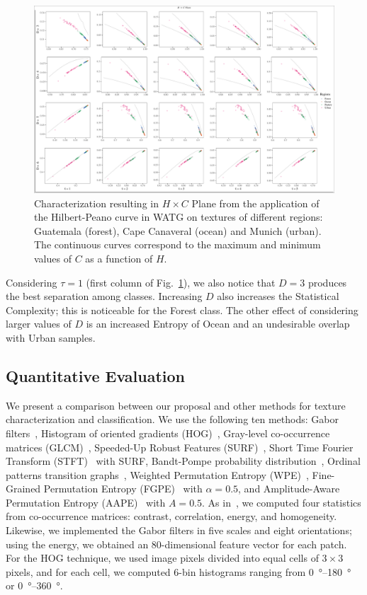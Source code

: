 \begin{figure}
	\centering
	\includegraphics[width=1\textwidth]{Figures/WATGHC.pdf}
	\caption{Characterization resulting in $H \times C$ Plane from the application of the Hilbert-Peano curve in WATG on textures of different regions: Guatemala (forest), Cape Canaveral (ocean) and Munich (urban). 
	The continuous curves correspond to the maximum and minimum values of $C$ as a function of $H$.}
	\label{fig:Regions}
\end{figure}

Considering $\tau=1$ (first column of Fig.~\ref{fig:Regions}), 
we also notice that $D=3$ produces the best separation among classes.
Increasing $D$ also increases the Statistical Complexity; this is noticeable for the Forest class.
The other effect of considering larger values of $ D $ is an increased Entropy of Ocean and an undesirable overlap with Urban samples.

\subsection{Quantitative Evaluation}

We present a comparison between our proposal and other methods for texture characterization and classification.
We use the following ten methods: 
Gabor filters~\cite{weldon1996efficient},  
Histogram of oriented gradients (HOG)~\cite{dalal2005histograms},
Gray-level co-occurrence matrices (GLCM)~\cite{kourgli2012texture}, 
Speeded-Up Robust Features (SURF)~\cite{bay2006surf},
Short Time Fourier Transform (STFT)~\cite{portnoff1980time} with SURF,
Bandt-Pompe probability distribution~\cite{Bandt2002Permutation}, 
Ordinal patterns transition graphs~\cite{Borges2019Transition},
Weighted Permutation Entropy (WPE)~\cite{Fadlallah2013Weightedpermutation},
Fine-Grained Permutation Entropy (FGPE)~\cite{xiao2009fine} with $\alpha = 0.5$, and
Amplitude-Aware Permutation Entropy (AAPE)~\cite{azami2016amplitude} with $A = 0.5$.
As in~\cite{guan2019covariance}, 
we computed four statistics from co-occurrence matrices: contrast, correlation, energy, and homogeneity.
Likewise, we implemented the Gabor filters in five scales and eight orientations; using the energy, we obtained an $80$-dimensional feature vector for each patch.
For the HOG technique, we used image pixels divided into equal cells of $3 \times 3$ pixels, and for each cell, we computed 6-bin histograms ranging from \SIrange{0}{180}{\degree} or \SIrange{0}{360}{\degree}.

